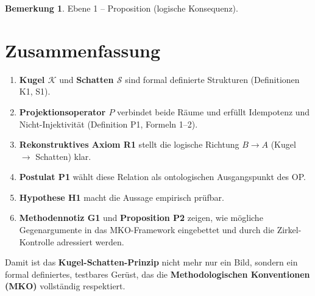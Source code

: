 \documentclass[11pt,a4paper]{article}
\theoremstyle{definition}
\newtheorem{remark}{Bemerkung}[section]
\theoremstyle{plain}
\begin{document}
\begin{remark}
Ebene 1 – Proposition (logische Konsequenz).
\end{remark}

\section{Zusammenfassung}
\begin{enumerate}[label=(\arabic*)]
  \item \textbf{Kugel $\mathcal{K}$} und \textbf{Schatten $\mathcal{S}$}
        sind formal definierte Strukturen (Definitionen K1, S1).
  \item \textbf{Projektionsoperator $P$} verbindet beide Räume und
        erfüllt Idempotenz und Nicht-Injektivität (Definition P1, Formeln 1–2).
  \item \textbf{Rekonstruktives Axiom R1} stellt die logische Richtung
        $B\to A$ (Kugel $\rightarrow$ Schatten) klar.
  \item \textbf{Postulat P1} wählt diese Relation als ontologischen
        Ausgangspunkt des OP.
  \item \textbf{Hypothese H1} macht die Aussage empirisch prüfbar.
  \item \textbf{Methodennotiz G1} und \textbf{Proposition P2} zeigen,
        wie mögliche Gegenargumente in das MKO-Framework eingebettet
        und durch die Zirkel-Kontrolle adressiert werden.
\end{enumerate}

Damit ist das \textbf{Kugel-Schatten-Prinzip} nicht mehr nur ein Bild,
sondern ein formal definiertes, testbares Gerüst, das die
\textbf{Methodologischen Konventionen (MKO)} vollständig respektiert.

\bigskip
\end{document}
